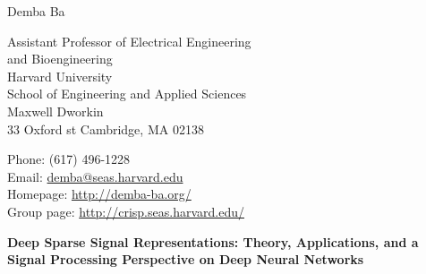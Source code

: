 \documentclass[12pt]{article}
\makeatletter
\let\saved@bibitem\@bibitem %
\def\HCode#1{}
\def\name{Demba Ba}
\makeatother
\begin{document}
\sloppy

\begingroup
\makeatletter
\let\@bibitem\saved@bibitem %
\endgroup

\HCode{<div class="fluid-container"}

\HCode{<div class="row">}
\HCode{<div class="col-md-12">}
\HCode{<h1>}
{\huge \name}
\HCode{</h1>}
\HCode{</div>} %
\HCode{</div>} %

\bigskip

\HCode{<div class="row">}
\HCode{<div class="col-md-4">}
\begin{minipage}[t]{0.5\textwidth}
  Assistant Professor of Electrical Engineering \\
  and Bioengineering \\
  Harvard University \\
  School of Engineering and Applied Sciences \\
  Maxwell Dworkin \\
  33 Oxford st
  Cambridge, MA 02138 \\
\end{minipage}
\HCode{</div>} %
\HCode{<div class="col-md-8">}
\begin{minipage}[t]{0.5\textwidth}
  Phone: (617) 496-1228 \\
  Email: \href{mailto:demba@seas.harvard.edu}{demba@seas.harvard.edu} \\
  Homepage: \href{http://demba-ba.org/}{http://demba-ba.org/} \\
  Group page: \href{http://crisp.seas.harvard.edu}{http://crisp.seas.harvard.edu/}
\end{minipage}
\HCode{</div>} %
\HCode{</div>} %

\begin{center} {\large \textbf{Deep Sparse Signal Representations: Theory, Applications, and a Signal Processing Perspective on Deep Neural Networks}}%
\end{center}
\end{document}

